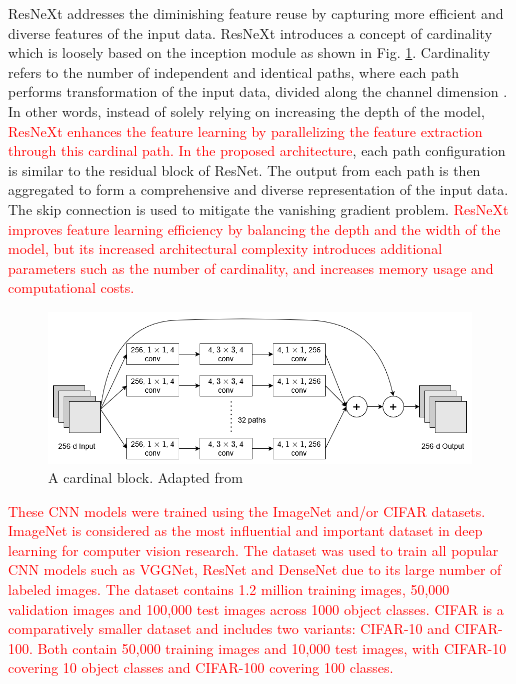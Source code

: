 \documentclass[preprint,12pt]{elsarticle}
\begin{document}
ResNeXt addresses the diminishing feature reuse by capturing more efficient and diverse features of the input data. ResNeXt introduces a concept of cardinality which is loosely based on the inception module as shown in Fig. \ref{fig_deep_sv_learning_cnn_resnext}. Cardinality refers to the number of independent and identical paths, where each path performs transformation of the input data, divided along the channel dimension  \citep{xie_aggregated_2017}. In other words, instead of solely relying on increasing the depth of the model, \textcolor{red}{ResNeXt enhances the feature learning by parallelizing the feature extraction through this cardinal path. In the proposed architecture}, each path configuration is similar to the residual block of ResNet. The output from each path is then aggregated to form a comprehensive and diverse representation of the input data. The skip connection is used to mitigate the vanishing gradient problem. \textcolor{red}{ResNeXt improves feature learning efficiency by balancing the depth and the width of the model, but its increased architectural complexity introduces additional parameters such as the number of cardinality, and increases memory usage and computational costs.}

\begin{figure}[h!]
    \centering
    \includegraphics[scale=0.45]{fig_deep_sv_learning_cnn_resnext.png}
    \caption{A cardinal block. Adapted from \citep{xie_aggregated_2017}}
    \label{fig_deep_sv_learning_cnn_resnext}
\end{figure}

\textcolor{red}{These CNN models were trained using the ImageNet \citep{noauthor_imagenet_nodate}  and/or CIFAR \citep{noauthor_cifar-10_nodate} datasets. ImageNet is considered as the most influential and important dataset in deep learning for computer vision research. The dataset was used to train all popular CNN models such as VGGNet, ResNet and DenseNet due to its large number of labeled images. The dataset contains 1.2 million training images, 50,000 validation images and 100,000 test images across 1000 object classes. CIFAR is a comparatively smaller dataset and includes two variants: CIFAR-10 and CIFAR-100. Both contain 50,000 training images and 10,000 test images, with CIFAR-10 covering 10 object classes and CIFAR-100 covering 100 classes.}
\end{document}
